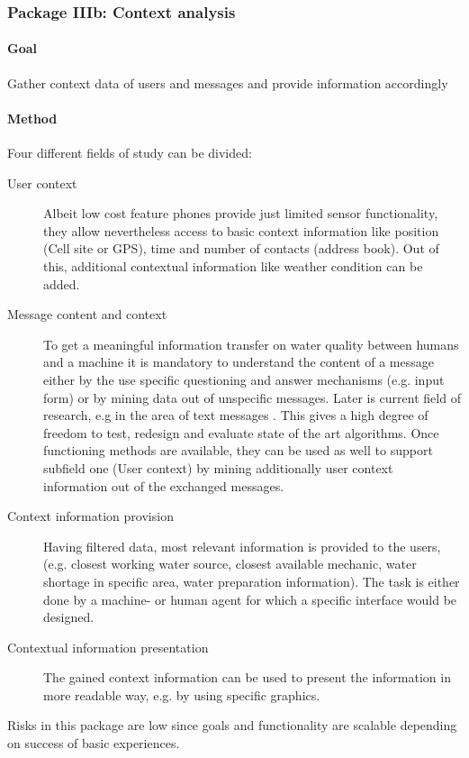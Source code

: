 \documentclass[11pt]{article}
\begin{document}
\subsubsection*{Package IIIb: Context analysis}
\paragraph{Goal} Gather context data of users and messages and provide information accordingly

\paragraph{Method}
Four different fields of study can be divided:
\begin{description}
 \item [User context] Albeit low cost feature phones provide just limited sensor functionality, they allow nevertheless access to basic context information like position (Cell site or GPS), time and number of contacts (address book). Out of this, additional contextual information like weather condition can be added.
 \item [Message content and context] To get a meaningful information transfer on water quality between humans and a machine it is mandatory to understand the content of a message either by the use specific questioning and answer mechanisms (e.g. input form) or by mining data out of unspecific messages. Later is current field of research, e.g in the area of text messages \cite{aggarwal2012mining}. This gives a high degree of freedom to test, redesign and evaluate state of the art algorithms. Once functioning methods are available, they can be used as well to support subfield one (User context) by mining additionally user context information out of the exchanged messages. 
 \item [Context information provision] Having filtered data, most relevant information is provided to the users, (e.g. closest working water source, closest available mechanic, water shortage in specific area, water preparation information). The task is either done by a machine- or human agent for which a specific interface would be designed.
 \item [Contextual information presentation] The gained context information can be used to present the information in more readable way, e.g. by using specific graphics.
\end{description}

Risks in this package are low since goals and functionality are scalable depending on success of basic experiences.
\end{document}
